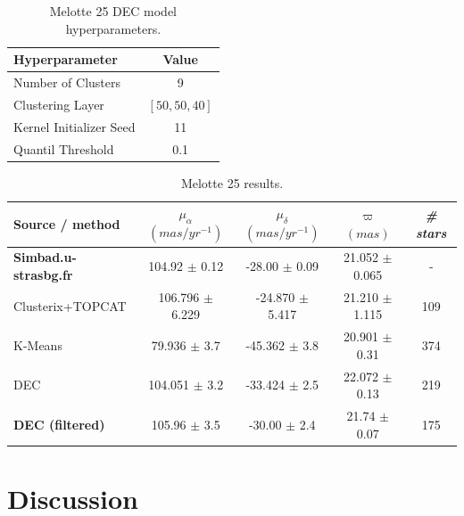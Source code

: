 \documentclass[11pt, a4paper, english]{book}
\begin{document}
\vfill

\begin{table}[h]
  \begin{center}
    \begin{tabular}{l|c}
      \textbf{Hyperparameter} & \textbf{Value} \\
      \hline
      Number of Clusters & 9 \\
      Clustering Layer & $\left[ 50, 50, 40 \right]$ \\
      Kernel Initializer Seed & 11 \\
      Quantil Threshold & 0.1 \\
    \end{tabular}
    \caption{Melotte 25 DEC model hyperparameters.}
    \label{tab:hyperparameters_melotte_25}
  \end{center}
\end{table}

\vfill

\begin{table}[h]
  \begin{center}
    \begin{tabular}{l|c|c|c|c}
      \textbf{Source / method} & \emph{$\mu_{\alpha}$ $(mas/yr^{-1})$} & \emph{$\mu_{\delta}$ $(mas/yr^{-1})$} & \emph{$\varpi$ $(mas)$} & \emph{\# stars} \\
      \hline
      \textbf{Simbad.u-strasbg.fr} & 104.92 $\pm$ 0.12 & -28.00 $\pm$ 0.09 & 21.052 $\pm$ 0.065 & - \\
      Clusterix+TOPCAT & 106.796 $\pm$ 6.229 & -24.870 $\pm$ 5.417 & 21.210 $\pm$ 1.115 & 109 \\
      K-Means & 79.936 $\pm$ 3.7 & -45.362 $\pm$ 3.8 & 20.901 $\pm$ 0.31 & 374 \\
      DEC & 104.051 $\pm$ 3.2 & -33.424 $\pm$ 2.5 & 22.072 $\pm$ 0.13 & 219 \\
      \textbf{DEC (filtered)} & 105.96 $\pm$ 3.5 & -30.00 $\pm$ 2.4 & 21.74 $\pm$ 0.07 & 175 \\
    \end{tabular}
    \caption{Melotte 25 results.}
    \label{tab:results_melotte_25}
  \end{center}
\end{table}

\vfill

\newpage

\section{Discussion}
\end{document}
